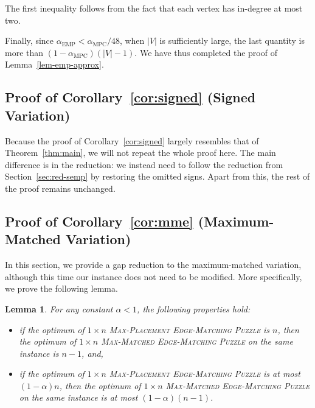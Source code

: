 \documentclass[11pt]{article}
\newtheorem{lemma}{Lemma}
\def\MPC{\mathrm{MPC}}
\def\EMP{\mathrm{EMP}}
\begin{document}
The first inequality follows from the fact that each vertex has in-degree at most two.

Finally, since $\alpha_{\EMP} < \alpha_{\MPC}/48$, when $|V|$ is sufficiently large, the last quantity is more than $(1 - \alpha_{\MPC})(|V| - 1)$. We have thus completed the proof of Lemma~\ref{lem-emp-approx}.

\subsection{Proof of Corollary~\ref{cor:signed} (Signed Variation)} \label{sec:msemp}

Because the proof of Corollary~\ref{cor:signed} largely resembles that of Theorem~\ref{thm:main}, we will not repeat the whole proof here. The main difference is in the reduction: we instead need to follow the reduction from Section~\ref{sec:red-semp} by restoring the omitted signs. Apart from this, the rest of the proof remains unchanged.


\subsection{Proof of Corollary~\ref{cor:mme} (Maximum-Matched Variation)} \label{sec:maxmatched}
In this section, we provide a gap reduction to the maximum-matched variation, although this time our instance does not need to be modified. More specifically, we prove the following lemma.

\begin{lemma} \label{lem-maxmatched-approx}
For any constant $\alpha < 1$, the following properties hold:
\begin{itemize}
	\item if the optimum of \textsc{$1 \times n$ Max-Placement Edge-Matching Puzzle} is $n$, then the optimum of  \textsc{$1 \times n$ Max-Matched Edge-Matching Puzzle} on the same instance is $n-1$, and,
	\item if the optimum of \textsc{$1 \times n$ Max-Placement Edge-Matching Puzzle} is at most $(1-\alpha)n$, then the optimum of  \textsc{$1 \times n$ Max-Matched Edge-Matching Puzzle} on the same instance is at most $(1-\alpha)(n-1)$.
\end{itemize}
\end{lemma}
\end{document}
